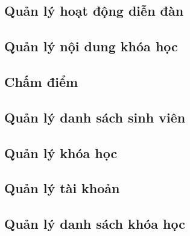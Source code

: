 \documentclass[./../main_file.tex]{subfiles}
\begin{document}
	\subsection{Quản lý hoạt động diễn đàn}
	\begin{figure}[H]
		\centering
		\resizebox{1.0\textwidth}{!}{}
	\end{figure}
	
	\subsection{Quản lý nội dung khóa học }
	\begin{figure}[H]
		\centering
		\resizebox{1.0\textwidth}{!}{}
	\end{figure}
	
	\subsection{Chấm điểm}
	
	
	\subsection{Quản lý danh sách sinh viên}
	\begin{figure}[H]
		\centering
		\resizebox{1.0\textwidth}{!}{}
	\end{figure}
	
	
	\subsection{Quản lý khóa học}
	\begin{figure}[H]
		\centering
		\resizebox{1.0\textwidth}{!}{}
	\end{figure}
	
	
	\subsection{Quản lý tài khoản }
	\begin{figure}[H]
		\centering
		\resizebox{1.0\textwidth}{!}{}
	\end{figure}

	
	\subsection{Quản lý danh sách khóa học}
		\begin{figure}[H]
		\centering
		\resizebox{1.0\textwidth}{!}{}
	\end{figure}

	
\end{document}
